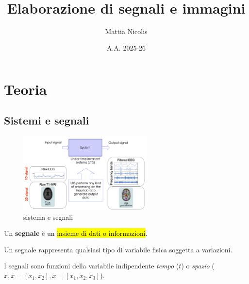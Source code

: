 \documentclass[a4paper, 12pt]{book}
\title{\textbf{Elaborazione di segnali e immagini}}
\author{Mattia Nicolis}
\date{A.A. 2025-26}
\begin{document}
    \maketitle

    \tableofcontents
    \markboth{}{}

    \chapter*{Teoria}

    \section*{Sistemi e segnali}

    \begin{figure}[h]
      \centering
      \includegraphics[width=0.6\textwidth, keepaspectratio]{foto/sistemi&segnali.png}
      \caption{sistema e segnali}
    \end{figure}

    \begin{tcolorbox}[
      colback=cyan!5!white,
      colframe=blue!50!black,
      title=\textbf{Segnale},
      coltitle=white,
      fonttitle=\bfseries,
      arc=3mm,
      boxrule=0.5pt,
      enhanced,
      breakable
    ]
      Un \textbf{segnale} è un \hl{insieme di dati o informazioni}.
    \end{tcolorbox}

    \vspace{2mm}

    Un segnale rappresenta qualsiasi tipo di variabile fisica soggetta a variazioni. 

    I segnali sono funzioni della variabile indipendente \textit{tempo} ($t$) o \textit{spazio} ($x, x = [x_1, x_2], x = [x_1, x_2, x_3]$).
\end{document}
